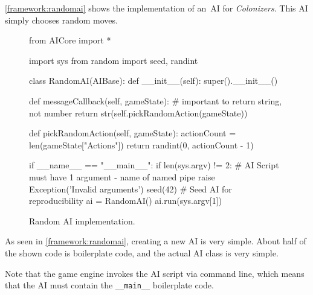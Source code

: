 \clearpage
\autoref{framework:randomai} shows the implementation of an~AI for \emph{Colonizers}.
This AI simply chooses random moves.

\begin{figure}[h!]
\begin{code}[commandchars=\\\{\},codes={\catcode`\$=3\catcode`\^=7\catcode`\_=8}]
from AICore import *

import sys
from random import seed, randint

class RandomAI(AIBase):
    def \_\_init\_\_(self):
        super().\_\_init\_\_()

    def messageCallback(self, gameState):
        # important to return string, not number
        return str(self.pickRandomAction(gameState))

    def pickRandomAction(self, gameState):
        actionCount = len(gameState["Actions"])
        return randint(0, actionCount - 1)

if \_\_name\_\_ == "\_\_main\_\_":
    if len(sys.argv) != 2:
        # AI Script must have 1 argument - name of named pipe
        raise Exception('Invalid arguments')
    seed(42) # Seed AI for reproducibility
    ai = RandomAI()
    ai.run(sys.argv[1])
\end{code}
\caption{Random AI implementation.}\label{framework:randomai}
\end{figure}

As seen in \autoref{framework:randomai}, creating a new AI is very simple.
About half of the shown code is boilerplate code, and the actual AI
class is very simple.

Note that the game engine invokes the AI script via command line, which
means that the AI must contain the \texttt{\_\_main\_\_} boilerplate code.
